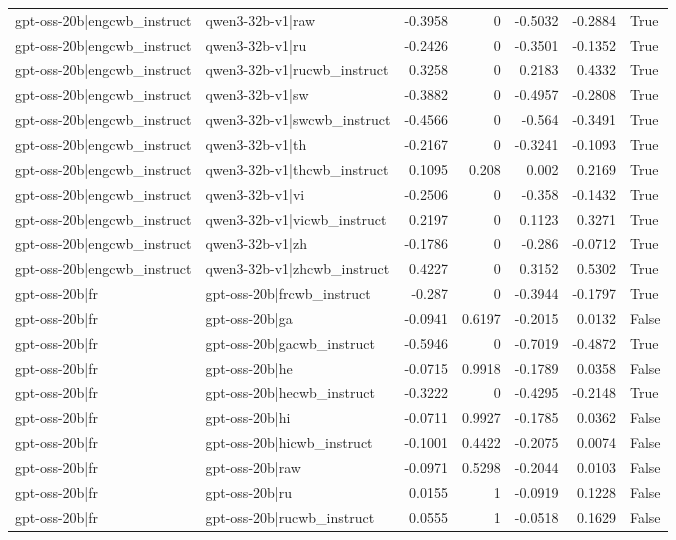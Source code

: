 \begin{table}
\begin{tabular}{l l r r r r l}
gpt-oss-20b|engcwb_instruct & qwen3-32b-v1|raw & -0.3958 & 0 & -0.5032 & -0.2884 & True \\
gpt-oss-20b|engcwb_instruct & qwen3-32b-v1|ru & -0.2426 & 0 & -0.3501 & -0.1352 & True \\
gpt-oss-20b|engcwb_instruct & qwen3-32b-v1|rucwb_instruct & 0.3258 & 0 & 0.2183 & 0.4332 & True \\
gpt-oss-20b|engcwb_instruct & qwen3-32b-v1|sw & -0.3882 & 0 & -0.4957 & -0.2808 & True \\
gpt-oss-20b|engcwb_instruct & qwen3-32b-v1|swcwb_instruct & -0.4566 & 0 & -0.564 & -0.3491 & True \\
gpt-oss-20b|engcwb_instruct & qwen3-32b-v1|th & -0.2167 & 0 & -0.3241 & -0.1093 & True \\
gpt-oss-20b|engcwb_instruct & qwen3-32b-v1|thcwb_instruct & 0.1095 & 0.208 & 0.002 & 0.2169 & True \\
gpt-oss-20b|engcwb_instruct & qwen3-32b-v1|vi & -0.2506 & 0 & -0.358 & -0.1432 & True \\
gpt-oss-20b|engcwb_instruct & qwen3-32b-v1|vicwb_instruct & 0.2197 & 0 & 0.1123 & 0.3271 & True \\
gpt-oss-20b|engcwb_instruct & qwen3-32b-v1|zh & -0.1786 & 0 & -0.286 & -0.0712 & True \\
gpt-oss-20b|engcwb_instruct & qwen3-32b-v1|zhcwb_instruct & 0.4227 & 0 & 0.3152 & 0.5302 & True \\
gpt-oss-20b|fr & gpt-oss-20b|frcwb_instruct & -0.287 & 0 & -0.3944 & -0.1797 & True \\
gpt-oss-20b|fr & gpt-oss-20b|ga & -0.0941 & 0.6197 & -0.2015 & 0.0132 & False \\
gpt-oss-20b|fr & gpt-oss-20b|gacwb_instruct & -0.5946 & 0 & -0.7019 & -0.4872 & True \\
gpt-oss-20b|fr & gpt-oss-20b|he & -0.0715 & 0.9918 & -0.1789 & 0.0358 & False \\
gpt-oss-20b|fr & gpt-oss-20b|hecwb_instruct & -0.3222 & 0 & -0.4295 & -0.2148 & True \\
gpt-oss-20b|fr & gpt-oss-20b|hi & -0.0711 & 0.9927 & -0.1785 & 0.0362 & False \\
gpt-oss-20b|fr & gpt-oss-20b|hicwb_instruct & -0.1001 & 0.4422 & -0.2075 & 0.0074 & False \\
gpt-oss-20b|fr & gpt-oss-20b|raw & -0.0971 & 0.5298 & -0.2044 & 0.0103 & False \\
gpt-oss-20b|fr & gpt-oss-20b|ru & 0.0155 & 1 & -0.0919 & 0.1228 & False \\
gpt-oss-20b|fr & gpt-oss-20b|rucwb_instruct & 0.0555 & 1 & -0.0518 & 0.1629 & False \\

\end{tabular}
\end{table}
